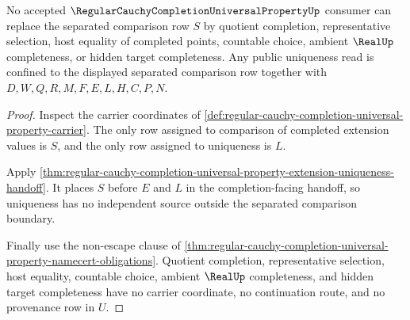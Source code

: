 \begin{theorem}
\label{thm:regular-cauchy-completion-universal-property-separated-nonescape}
No accepted $\RegularCauchyCompletionUniversalPropertyUp$ consumer can replace the separated comparison row $S$ by quotient completion, representative selection, host equality of completed points, countable choice, ambient $\RealUp$ completeness, or hidden target completeness. Any public uniqueness read is confined to the displayed separated comparison row together with $D,W,Q,R,M,F,E,L,H,C,P,N$.
\end{theorem}
\begin{proof}
Inspect the carrier coordinates of \autoref{def:regular-cauchy-completion-universal-property-carrier}. The only row assigned to comparison of completed extension values is $S$, and the only row assigned to uniqueness is $L$.

Apply \autoref{thm:regular-cauchy-completion-universal-property-extension-uniqueness-handoff}. It places $S$ before $E$ and $L$ in the completion-facing handoff, so uniqueness has no independent source outside the separated comparison boundary.

Finally use the non-escape clause of \autoref{thm:regular-cauchy-completion-universal-property-namecert-obligations}. Quotient completion, representative selection, host equality, countable choice, ambient $\RealUp$ completeness, and hidden target completeness have no carrier coordinate, no continuation route, and no provenance row in $U$.
\end{proof}

